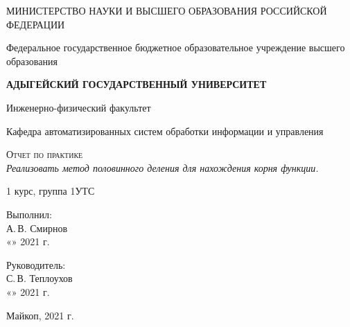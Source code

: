 \documentclass[12pt,a4paper]{scrartcl}
\begin{document}
	\begin{titlepage}
		\begin{center}
			\large
			МИНИСТЕРСТВО НАУКИ И ВЫСШЕГО ОБРАЗОВАНИЯ РОССИЙСКОЙ ФЕДЕРАЦИИ
			
			Федеральное государственное бюджетное образовательное учреждение высшего образования
			
			\textbf{АДЫГЕЙСКИЙ ГОСУДАРСТВЕННЫЙ УНИВЕРСИТЕТ}
			\vspace{0.25cm}
			
			Инженерно-физический факультет
			
			Кафедра автоматизированных систем обработки информации и управления
			\vfill

			\vfill
			
			\textsc{Отчет по практике}\\[5mm]
			
			{\LARGE \textit{Реализовать метод половинного деления для нахождения корня функции.}}
			\bigskip
			
			1 курс, группа 1УТС
		\end{center}
		\vfill
		
		\newlength{\ML}
		\hfill\begin{minipage}{0.5\textwidth}
			Выполнил:\\
			\underline{\hspace{\ML}} А.\,В. Смирнов\\
			«\underline{\hspace{0.7cm}}» \underline{\hspace{2cm}} 2021 г.
		\end{minipage}%
		\bigskip
		
		\hfill\begin{minipage}{0.5\textwidth}
			Руководитель:\\
			\underline{\hspace{\ML}} С.\,В. Теплоухов\\
			«\underline{\hspace{0.7cm}}» \underline{\hspace{2cm}} 2021 г.
		\end{minipage}%
		\vfill
		
		\begin{center}
			Майкоп, 2021 г.
		\end{center}
	\end{titlepage}
\end{document}
